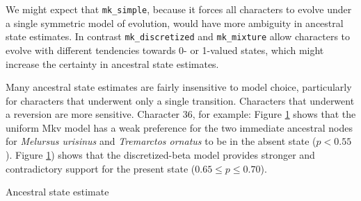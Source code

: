 We might expect that {\tt mk\_simple}, because it forces all characters to evolve under a single symmetric model of evolution, would have more ambiguity in ancestral state estimates.
In contrast {\tt mk\_discretized} and {\tt mk\_mixture} allow characters to evolve with different tendencies towards 0- or 1-valued states, which might increase the certainty in ancestral state estimates.


Many ancestral state estimates are fairly insensitive to model choice, particularly for characters that underwent only a single transition.
Characters that underwent a reversion are more sensitive.
Character 36, for example:
Figure \ref{fig:mk_simple_ase} shows that the uniform Mkv model has a weak preference for the two immediate ancestral nodes for {\it Melursus urisinus} and {\it Tremarctos ornatus} to be in the absent state ($p < 0.55$).
Figure \ref{fig:mk_simple_ase}) shows that the discretized-beta model provides stronger and contradictory support for the present state ($0.65 \leq p \leq 0.70$).

\begin{figure}[h!]
\label{fig:mk_simple_ase}
\end{figure}

\begin{figure}[h!]
\label{fig:mk_discretized_ase}
\end{figure}

Ancestral state estimate



\newpage
